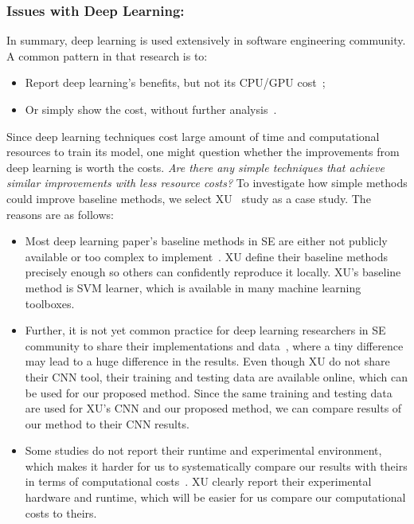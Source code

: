 \documentclass[sigconf]{acmart}
\theoremstyle{break}
\newcommand{\bi}{\begin{itemize}[leftmargin=0.4cm]}
\newcommand{\ei}{\end{itemize}}
\begin{document}
 \subsubsection{Issues with Deep Learning:}
 In summary,  deep learning is used extensively in software
 engineering community.  A common pattern
 in that research is to:
 \bi
 \item
 Report deep learning's benefits, but not  its CPU/GPU cost~\cite{white2015toward,choetkiertikul2016deep,yuan2014droid,mou2016convolutional};
 \item
 Or simply show the cost, without further analysis~\cite{wang2016automatically, lam2015combining, gu2016deep, xu2016predicting, white2016deep}.
 \ei
Since  deep learning techniques cost large amount of time and computational
resources to train its model,
one might question whether the improvements from deep learning is worth
the costs. {\it Are there any simple techniques that achieve similar improvements
with less resource costs?} To investigate how simple methods could improve baseline
methods, we select XU~\cite{xu2016predicting} study as a case study. The reasons
are as follows:
\bi 
 
\item Most deep learning paper's baseline methods in SE are either not publicly available or too complex to implement~\cite{white2016deep,lam2015combining}. XU define their baseline methods precisely enough so others can confidently reproduce it locally.
XU's baseline method is SVM learner, which is available in many machine learning toolboxes.

\item
Further, it is not
yet common practice for deep learning researchers in SE community
to share their implementations and data~\cite{white2016deep,white2015toward,lam2015combining,wang2016automatically,choetkiertikul2016deep,gu2016deep}, where a tiny difference may lead to a huge difference in the results. Even though XU do not share their CNN tool, their
training and testing data are available online, which can be used for our proposed method. Since the same training and testing data are used for XU's CNN and our proposed method,  we can compare results of our method to their CNN results.
\item Some studies do not report their runtime and experimental environment, which makes it harder for us
to systematically compare our results with theirs in terms of computational costs~\cite{choetkiertikul2016deep,yuan2014droid,white2015toward, mou2016convolutional}.
XU clearly report their experimental hardware and runtime, which will be easier for us compare our computational costs to theirs.
\ei
\end{document}
